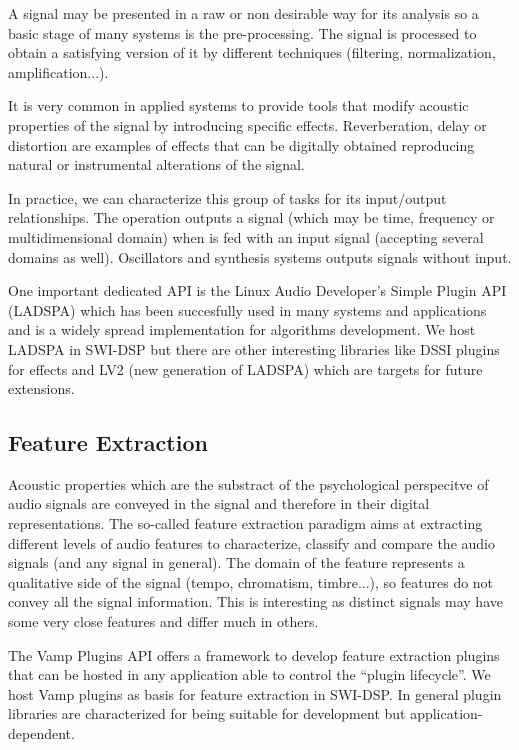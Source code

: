 \documentclass[runningheads]{llncs}
\begin{document}
A signal may be presented in a raw or non desirable way for its analysis so a basic stage of many systems is the pre-processing. The signal is processed to obtain a satisfying version of it by different techniques (filtering, normalization, amplification...).

It is very common in applied systems to provide tools that modify acoustic properties of the signal by introducing specific effects. Reverberation, delay or distortion are examples of effects that can be digitally obtained reproducing natural or instrumental alterations of the signal.

In practice, we can characterize this group of tasks for its input/output relationships. The operation outputs a signal (which may be time, frequency or multidimensional domain) when is fed with an input signal (accepting several domains as well). Oscillators and synthesis systems outputs signals without input.

One important dedicated API is the Linux Audio Developer's Simple Plugin API (LADSPA) \cite{ladspa}  which has been succesfully used in many systems and applications and is a widely spread implementation for algorithms development. We host LADSPA in SWI-DSP but there are other interesting libraries like DSSI plugins for effects and LV2 (new generation of LADSPA) which are targets for future extensions. 

\subsection{Feature Extraction}\label{subsec:feature}

Acoustic properties which are the substract of the psychological perspecitve of audio signals are conveyed in the signal and therefore in their digital representations. The so-called feature extraction paradigm aims at extracting different levels of audio features to characterize, classify and compare the audio signals (and any signal in general). The domain of the feature represents a qualitative side of the signal (tempo, chromatism, timbre...), so features do not convey all the signal information. This is interesting as distinct signals may have some very close features and differ much in others.

The Vamp Plugins API \cite{vamp} offers a framework to develop feature extraction plugins that can be hosted in any application able to control the ``plugin lifecycle''. We host Vamp plugins as basis for feature extraction in SWI-DSP. In general plugin libraries are characterized for being suitable for development but application-dependent.
\end{document}
